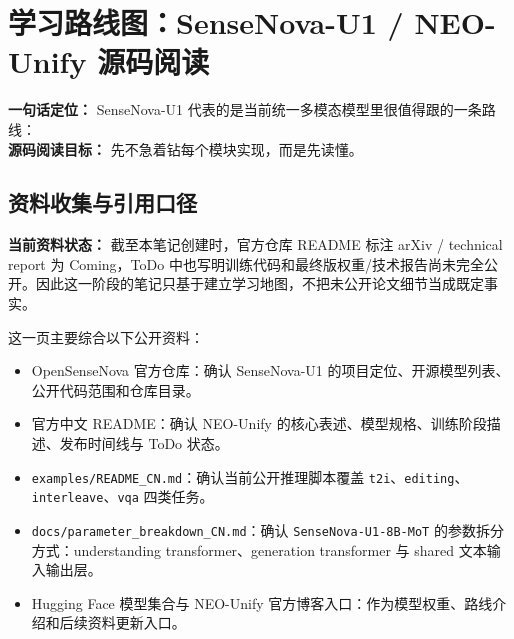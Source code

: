 
\section{学习路线图：SenseNova-U1 / NEO-Unify 源码阅读}

\begin{conceptbox}
\textbf{一句话定位：} SenseNova-U1 代表的是当前统一多模态模型里很值得跟的一条路线：\\
\textbf{源码阅读目标：} 先不急着钻每个模块实现，而是先读懂。
\end{conceptbox}

\subsection*{资料收集与引用口径}

\begin{warnbox}
\textbf{当前资料状态：} 截至本笔记创建时，官方仓库 README 标注 arXiv / technical report 为 Coming，ToDo 中也写明训练代码和最终版权重/技术报告尚未完全公开。因此这一阶段的笔记只基于建立学习地图，不把未公开论文细节当成既定事实。
\end{warnbox}

这一页主要综合以下公开资料：
\begin{itemize}[leftmargin=1.5em]
  \item OpenSenseNova 官方仓库：确认 SenseNova-U1 的项目定位、开源模型列表、公开代码范围和仓库目录。
  \item 官方中文 README：确认 NEO-Unify 的核心表述、模型规格、训练阶段描述、发布时间线与 ToDo 状态。
  \item \texttt{examples/README\_CN.md}：确认当前公开推理脚本覆盖 \texttt{t2i}、\texttt{editing}、\texttt{interleave}、\texttt{vqa} 四类任务。
  \item \texttt{docs/parameter\_breakdown\_CN.md}：确认 \texttt{SenseNova-U1-8B-MoT} 的参数拆分方式：understanding transformer、generation transformer 与 shared 文本输入输出层。
  \item Hugging Face 模型集合与 NEO-Unify 官方博客入口：作为模型权重、路线介绍和后续资料更新入口。
\end{itemize}

